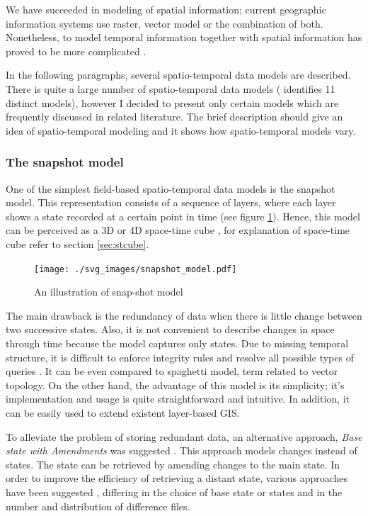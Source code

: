 \documentclass[a4paper,12pt,oneside]{book}
\begin{document}
We have succeeded in modeling of spatial information;
current geographic information systems use raster, vector model or the combination of both.
Nonetheless, to model temporal information together with spatial information
has proved to be more complicated \cite{peuquet2001}.

In the following paragraphs, several spatio-temporal data models are described.
There is quite a large number of spatio-temporal data models (\cite{pelekis2004} identifies 11 distinct models), however
I decided to present only certain models which are frequently discussed in related literature.
The brief description should give an idea of spatio-temporal modeling
and it shows how spatio-temporal models vary.

\subsubsection{The snapshot model}
One of the simplest field-based spatio-temporal data models is the snapshot model.
This representation consists of a sequence of layers,
where each layer shows a state recorded at a certain point in time (see figure \ref{fig:snapshot_model}).
Hence, this model can be perceived as a 3D or 4D space-time cube \cite{peuquet2001}, for explanation of space-time cube refer to section \ref{sec:stcube}.

\begin{figure}[h!]
  \centering
  \texttt{[image: ./svg\_images/snapshot\_model.pdf]}
  \caption{An illustration of snap-shot model}
  \label{fig:snapshot_model}
\end{figure}


The main drawback is the redundancy of data when there is little change between two successive states.
Also, it is not convenient to describe changes in space through time because the model captures only states.
Due to missing temporal structure, it is difficult to enforce integrity rules
and resolve all possible types of queries \cite{pelekis2004}.
It can be even compared to spaghetti model, term related to vector topology.
On the other hand, the advantage of this model is its simplicity;
it's implementation and usage is quite straightforward and intuitive.
In addition, it can be easily used to extend existent layer-based GIS.

To alleviate the problem of storing redundant data, an alternative approach,
\emph{Base state with Amendments} was suggested \cite{langran1988}.
This approach models changes instead of states.
The state can be retrieved by amending changes to the main state.
In order to improve the efficiency of retrieving a distant state,
various approaches have been suggested \cite{wang2012},
differing in the choice of base state or states and in the number and distribution of difference files.
\end{document}
